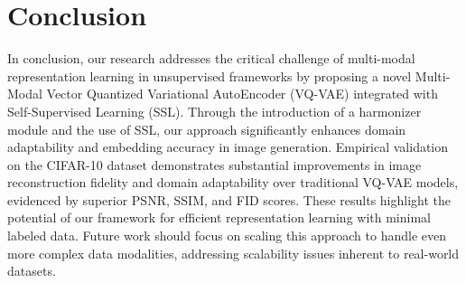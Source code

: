 \section{Conclusion}

In conclusion, our research addresses the critical challenge of multi-modal representation learning in unsupervised frameworks by proposing a novel Multi-Modal Vector Quantized Variational AutoEncoder (VQ-VAE) integrated with Self-Supervised Learning (SSL). Through the introduction of a harmonizer module and the use of SSL, our approach significantly enhances domain adaptability and embedding accuracy in image generation. Empirical validation on the CIFAR-10 dataset demonstrates substantial improvements in image reconstruction fidelity and domain adaptability over traditional VQ-VAE models, evidenced by superior PSNR, SSIM, and FID scores. These results highlight the potential of our framework for efficient representation learning with minimal labeled data. Future work should focus on scaling this approach to handle even more complex data modalities, addressing scalability issues inherent to real-world datasets.

